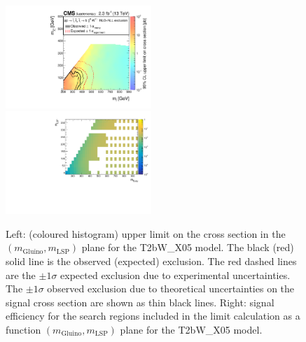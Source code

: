 \clearpage
\begin{figure}[t]
  \begin{center}
    \includegraphics[width=0.49\textwidth]{supplementary/figures/RA1T2bW-X05XSEC} \, 
    \includegraphics[width=0.49\textwidth]{supplementary/figures/T2bW_X05_merging_4_cats} \,     
  \end{center}
  \caption{Left: (coloured histogram) upper limit on the cross section in the $(m_{\mathrm{Gluino}},m_{\mathrm{LSP}})$ plane for the T2bW\_X05 model. 
  The black (red) solid line is the observed (expected) exclusion. The red dashed lines are the $\pm1\sigma$ expected exclusion due to experimental uncertainties. 
  The $\pm1\sigma$ observed exclusion due to theoretical uncertainties on the signal cross section are shown as thin black lines. 
  Right: signal efficiency for the search regions included in the limit calculation as a function $(m_{\mathrm{Gluino}},m_{\mathrm{LSP}})$ plane for the T2bW\_X05 model. 
  \label{fig:T2bW_X05_excl}}
\end{figure}


